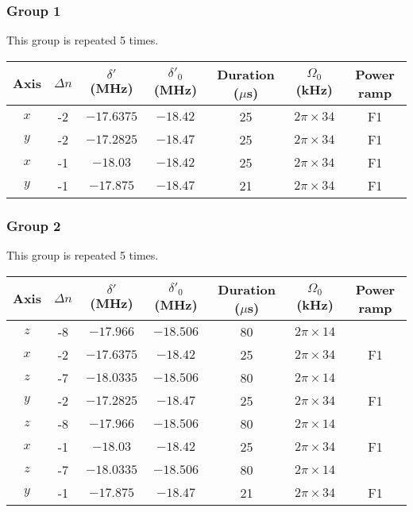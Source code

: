 \documentclass[aps,secnumarabic,amsmath,amssymb]{revtex4}
\begin{document}
\subsubsection{Group 1}
This group is repeated 5 times.
\begin{center}
  \begin{tabular}{|c|c|c|c|c|c|c|}
    \hline
    Axis&$\Delta n$&$\delta'$ (MHz)&$\delta'_0$ (MHz)&Duration ($\mu$s)& $\Omega_0$ (kHz)&Power ramp\\\hline
    $x$&-2&$-17.6375$&$-18.42$&25&$2\pi\times34$&F1\\\hline
    $y$&-2&$-17.2825$&$-18.47$&25&$2\pi\times34$&F1\\\hline
    $x$&-1&$-18.03$&$-18.42$&25&$2\pi\times34$&F1\\\hline
    $y$&-1&$-17.875$&$-18.47$&21&$2\pi\times34$&F1\\\hline
  \end{tabular}
\end{center}
\subsubsection{Group 2}
This group is repeated 5 times.
\begin{center}
  \begin{tabular}{|c|c|c|c|c|c|c|}
    \hline
    Axis&$\Delta n$&$\delta'$ (MHz)&$\delta'_0$ (MHz)&Duration ($\mu$s)& $\Omega_0$ (kHz)&Power ramp\\\hline
    $z$&-8&$-17.966$&$-18.506$&80&$2\pi\times14$&\\\hline
    $x$&-2&$-17.6375$&$-18.42$&25&$2\pi\times34$&F1\\\hline
    $z$&-7&$-18.0335$&$-18.506$&80&$2\pi\times14$&\\\hline
    $y$&-2&$-17.2825$&$-18.47$&25&$2\pi\times34$&F1\\\hline
    $z$&-8&$-17.966$&$-18.506$&80&$2\pi\times14$&\\\hline
    $x$&-1&$-18.03$&$-18.42$&25&$2\pi\times34$&F1\\\hline
    $z$&-7&$-18.0335$&$-18.506$&80&$2\pi\times14$&\\\hline
    $y$&-1&$-17.875$&$-18.47$&21&$2\pi\times34$&F1\\\hline
  \end{tabular}
\end{center}
\end{document}
